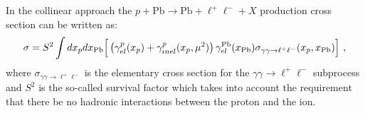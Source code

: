 %
% 
%


In the collinear approach the $p+\textrm{Pb}\rightarrow \textrm{Pb} + \ell^+\ell^- + X$ production cross section can be written as:
%
\begin{equation}
\sigma 
= S^2 \int dx_p dx_{\rm Pb} \Big[
\left ( \gamma^{p}_{el}(x_p) + \gamma^{p}_{inel}(x_p,\mu^2) \right)
 \gamma^{\rm Pb}_{el}(x_{\rm Pb})
\sigma_{\gamma \gamma \rightarrow \ell^+ \ell^-}(x_p, x_{\rm Pb})  \Big]~,
\label{collinear_factorization_formula}
\end{equation}
%
where $\sigma_{\gamma \gamma \rightarrow \ell^+ \ell^-}$
is the elementary cross section for the $\gamma \gamma \rightarrow \ell^+ \ell^-$ subprocess and $S^2$ is the so-called survival factor which takes into account the requirement that there be no hadronic interactions between the proton and the ion.

